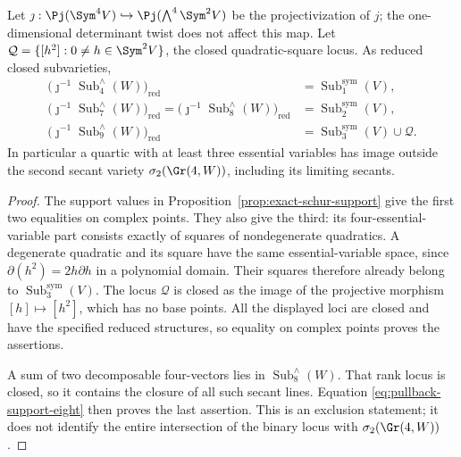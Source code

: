 \begin{proposition}
\label{prop:schur-subspace-pullbacks}
Let \(\jmath:\Pj(\Sym^4V)\hookrightarrow
\Pj(\bigwedge^4\Sym^2V)\) be the projectivization of \(j\);
the one-dimensional determinant twist does not affect this map.
Let \(\mathcal Q=\{[h^2]:0\ne h\in\Sym^2V\}\), the closed
quadratic-square locus.  As reduced closed subvarieties,
\begin{align}
 \bigl(\jmath^{-1}\operatorname{Sub}^{\wedge}_4(W)\bigr)_{\mathrm{red}}
       &=\operatorname{Sub}^{\mathrm{sym}}_1(V),\label{eq:pullback-support-four}\\
 \bigl(\jmath^{-1}\operatorname{Sub}^{\wedge}_7(W)\bigr)_{\mathrm{red}}
 =\bigl(\jmath^{-1}\operatorname{Sub}^{\wedge}_8(W)\bigr)_{\mathrm{red}}
       &=\operatorname{Sub}^{\mathrm{sym}}_2(V),\label{eq:pullback-support-eight}\\
 \bigl(\jmath^{-1}\operatorname{Sub}^{\wedge}_9(W)\bigr)_{\mathrm{red}}
       &=\operatorname{Sub}^{\mathrm{sym}}_3(V)\cup\mathcal Q.
       \label{eq:pullback-support-nine}
\end{align}
In particular a quartic with at least three essential variables has
image outside the second secant variety
\(\sigma_2(\Gr(4,W))\), including its limiting secants.
\end{proposition}
\begin{proof}
The support values in Proposition~\ref{prop:exact-schur-support} give
the first two equalities on complex points.  They also give the third:
its four-essential-variable part consists exactly of squares of
nondegenerate quadratics.  A degenerate quadratic and its square have
the same essential-variable space, since
\(\partial(h^2)=2h\partial h\) in a polynomial domain.
Their squares therefore already belong to
\(\operatorname{Sub}^{\mathrm{sym}}_3(V)\).
The locus \(\mathcal Q\) is closed as the image of the projective
morphism \([h]\mapsto[h^2]\), which has no base points.
All the displayed loci are closed and have the specified reduced
structures, so equality on complex points proves the assertions.

A sum of two decomposable four-vectors lies in
\(\operatorname{Sub}^{\wedge}_8(W)\).  That rank locus is closed,
so it contains the closure of all such secant lines.  Equation
\eqref{eq:pullback-support-eight} then proves the last assertion.
This is an exclusion statement; it does not identify the entire
intersection of the binary locus with \(\sigma_2(\Gr(4,W))\).
\end{proof}

